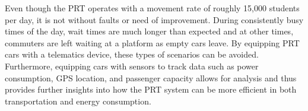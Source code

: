 Even though the PRT operates with a movement rate of roughly 15,000 students per day, it is not without faults or need of improvement. During consistently busy times of the day, wait times are much longer than expected and at other times, commuters are left waiting at a platform as empty cars leave. By equipping PRT cars with a telematics device, these types of scenarios can be avoided. Furthermore, equipping cars with sensors to track data such as power consumption, GPS location, and passenger capacity allows for analysis and thus provides further insights into how the PRT system can be more efficient in both transportation and energy consumption. 